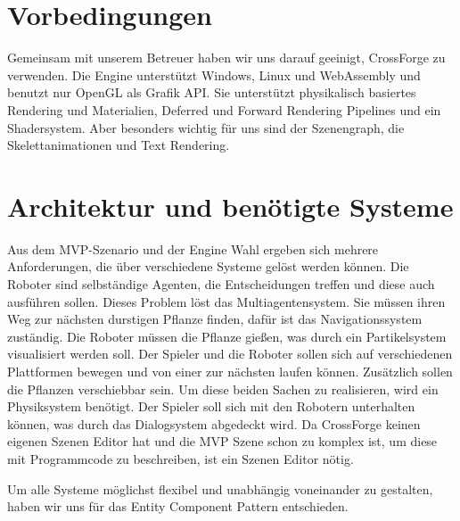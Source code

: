 
\section{Vorbedingungen}

Gemeinsam mit unserem Betreuer haben wir uns darauf geeinigt, CrossForge zu verwenden. Die Engine unterstützt Windows, Linux und WebAssembly und benutzt nur OpenGL als Grafik API. Sie unterstützt physikalisch basiertes Rendering und Materialien, Deferred und Forward Rendering Pipelines und ein Shadersystem. Aber besonders wichtig für uns sind der Szenengraph, die Skelettanimationen und Text Rendering.

\section{Architektur und benötigte Systeme}

Aus dem MVP-Szenario und der Engine Wahl ergeben sich mehrere Anforderungen, die über verschiedene Systeme gelöst werden können. Die Roboter sind selbständige Agenten, die Entscheidungen treffen und diese auch ausführen sollen. Dieses Problem löst das Multiagentensystem. Sie müssen ihren Weg zur nächsten durstigen Pflanze finden, dafür ist das Navigationssystem zuständig. Die Roboter müssen die Pflanze gießen, was durch ein Partikelsystem visualisiert werden soll. Der Spieler und die Roboter sollen sich auf verschiedenen Plattformen bewegen und von einer zur nächsten laufen können. Zusätzlich sollen die Pflanzen verschiebbar sein. Um diese beiden Sachen zu realisieren, wird ein Physiksystem benötigt.
Der Spieler soll sich mit den Robotern unterhalten können, was durch das Dialogsystem abgedeckt wird.
Da CrossForge keinen eigenen Szenen Editor hat und die MVP Szene schon zu komplex ist, um diese mit Programmcode zu beschreiben, ist ein Szenen Editor nötig.

Um alle Systeme möglichst flexibel und unabhängig voneinander zu gestalten, haben wir uns für das Entity Component Pattern entschieden.

